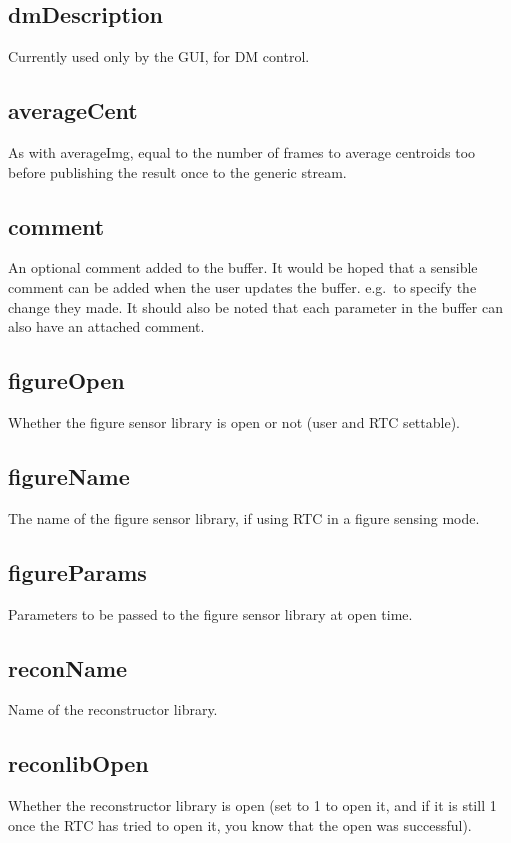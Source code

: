 \documentclass[a4,10pt]{article}
\begin{document}
\subsection{dmDescription}
Currently used only by the GUI, for DM control.

\subsection{averageCent}
As with averageImg, equal to the number of frames to average centroids
too before publishing the result once to the generic stream.


\subsection{comment}
An optional comment added to the buffer.  It would be hoped that
a sensible comment can be added when the user updates the buffer.
e.g.\ to specify the change they made.  It should also be noted that
each parameter in the buffer can also have an attached comment.



\subsection{figureOpen}
Whether the figure sensor library is open or not (user and RTC
settable).

\subsection{figureName}
The name of the figure sensor library, if using RTC in a figure
sensing mode.

\subsection{figureParams}
Parameters to be passed to the figure sensor library at open time.

\subsection{reconName}
Name of the reconstructor library.



\subsection{reconlibOpen}
Whether the reconstructor library is open (set to 1 to open it, and if
it is still 1 once the RTC has tried to open it, you know that the
open was successful).
\end{document}
